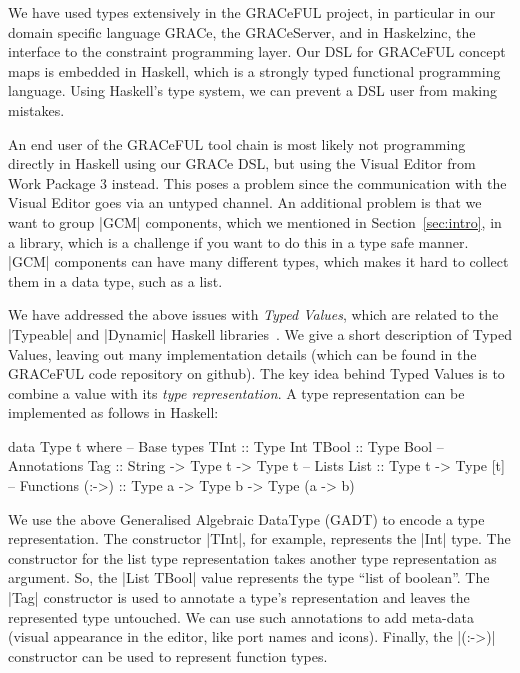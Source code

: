 \documentclass{article}
\begin{document}
We have used types extensively in the GRACeFUL project, in particular
in our domain specific language GRACe, the GRACeServer, and in
Haskelzinc, the interface to the constraint programming layer.
%
Our DSL for GRACeFUL concept maps is embedded in Haskell, which is a
strongly typed functional programming language.
%
Using Haskell's type system, we can prevent a DSL user from making
mistakes.

An end user of the GRACeFUL tool chain is most likely not programming
directly in Haskell using our GRACe DSL, but using the Visual Editor
from Work Package 3 instead.
%
This poses a problem since the communication with the Visual Editor goes
via an untyped channel.
%
An additional problem is that we want to group |GCM| components, which
we mentioned in Section~\ref{sec:intro}, in a library, which is a
challenge if you want to do this in a type safe manner.
%
|GCM| components can have many different types, which makes it hard to
collect them in a data type, such as a list.

We have addressed the above issues with \emph{Typed Values}, which are
related to the |Typeable| and |Dynamic| Haskell
libraries~\cite{DataDynamic}.
%
We give a short description of Typed Values, leaving out many
implementation details (which can be found in the GRACeFUL code
repository on github).
%
The key idea behind Typed Values is to combine a value with its
\emph{type representation}.
%
A type representation can be implemented as follows in Haskell:
%
\begin{haskellcode}
data Type t where
  -- Base types
  TInt   :: Type Int
  TBool  :: Type Bool
  -- Annotations
  Tag   :: String -> Type t -> Type t
  -- Lists
  List  :: Type t -> Type [t]
  -- Functions
  (:->) :: Type a -> Type b -> Type (a -> b)
\end{haskellcode}
%
We use the above Generalised Algebraic DataType (GADT) to encode a
type representation.
%
The constructor |TInt|, for example, represents the |Int| type.
%
The constructor for the list type representation takes another type
representation as argument.
%
So, the |List TBool| value represents the type ``list of boolean''.
%
The |Tag| constructor is used to annotate a type's representation and
leaves the represented type untouched.
%
We can use such annotations to add meta-data (visual appearance in the
editor, like port names and icons).
%
Finally, the |(:->)| constructor can be used to represent function
types.
\end{document}
